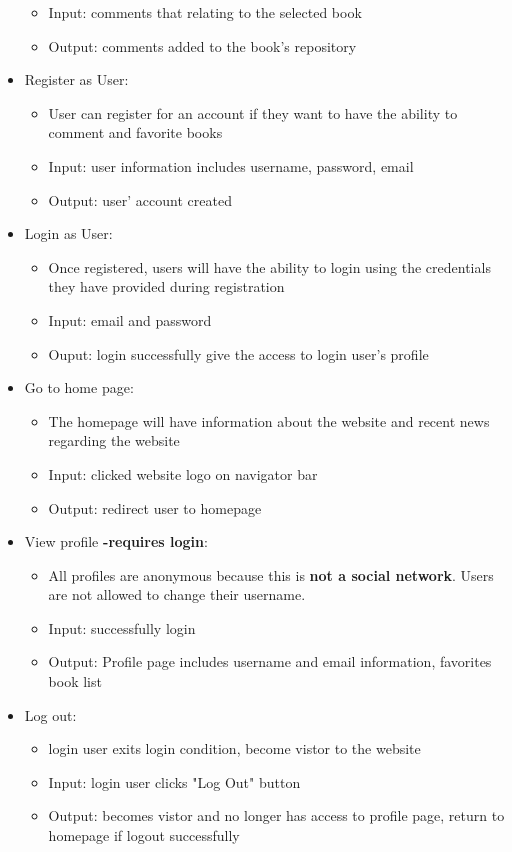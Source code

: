\documentclass[letter, 12pt, titlepage]{article}
\begin{document}
\begin{itemize}
\begin{itemize}
		      \item  Input: comments that relating to the selected book
		      \item  Output: comments added to the book's repository
	      \end{itemize}
	\item Register as User:
	      \begin{itemize}
		      \item  User can register for an account if they want to have the ability to comment and favorite books
		      \item  Input: user information includes username, password, email
		      \item  Output: user' account created
	      \end{itemize}
	\item Login as User:
	      \begin{itemize}
		      \item  Once registered, users will have the ability to login using the credentials they have provided during registration
		      \item  Input: email and password
		      \item  Ouput: login successfully give the access to login user's profile
	      \end{itemize}
	\item Go to home page:
	      \begin{itemize}
		      \item  The homepage will have information about the website and recent news regarding the website
		      \item  Input: clicked website logo on navigator bar
		      \item  Output: redirect user to homepage
	      \end{itemize}
	\item View profile \textbf{-requires login}:
	      \begin{itemize}
		      \item  All profiles are anonymous because this is \textbf{not a social network}. Users are not allowed to change their username.
		      \item  Input: successfully login
		      \item  Output: Profile page includes username and email information, favorites book list
	      \end{itemize}
	\item Log out:
	      \begin{itemize}
		      \item  login user exits login condition, become vistor to the website
		      \item  Input: login user clicks "Log Out" button
		      \item  Output: becomes vistor and no longer has access to profile page, return to homepage if logout successfully
	      \end{itemize}

\end{itemize}
\end{document}
